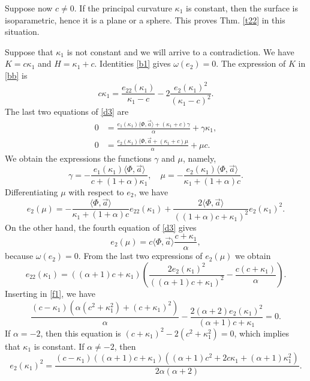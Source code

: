 \documentclass{birkjour}
\theoremstyle{definition}
\theoremstyle{remark}
\numberwithin{equation}{section}
\begin{document}
 Suppose now $c\not=0$. If the principal curvature   $\kappa_1$ is constant, then the surface is isoparametric, hence it is a plane or a sphere. This proves Thm. \ref{t22} in this situation.
 
 Suppose that $\kappa_1$ is not constant and we will arrive to a contradiction. We have $K=c\kappa_1$ and $H=\kappa_1+c$. Identities \eqref{b1} gives $\omega(e_2)=0$. The expression of $K$ in \eqref{bb} is
 \begin{equation}\label{f1}
 c\kappa_1=\frac{e_{22}(\kappa_1)}{\kappa_1-c}-2\frac{e_2(\kappa_1)^2}{(\kappa_1-c)^2}. 
 \end{equation}
The last two equations of \eqref{d3} are
 \begin{equation*}
 \begin{split}
 0&=\frac{e_1(\kappa_1)\langle\Phi,\vec{a}\rangle+(\kappa_1+c)\gamma}{\alpha}+\gamma \kappa_1,\\
 0&=\frac{e_2(\kappa_1)\langle\Phi,\vec{a}+(\kappa_1+c)\mu}{\alpha}+\mu c.
 \end{split}
 \end{equation*}
 We obtain the expressions the functions $\gamma$ and $\mu$, namely,  
 $$\gamma=-\frac{e_1(\kappa_1)\langle\Phi,\vec{a}\rangle}{c+(1+\alpha)\kappa_1},\quad \mu=-\frac{e_2(\kappa_1)\langle\Phi,\vec{a}\rangle}{\kappa_1+(1+\alpha)c}.$$
  Differentiating $\mu$ with respect to $e_2$, we have
\begin{equation*}
e_2(\mu)=-\frac{\langle\Phi,\vec{a}\rangle}{\kappa_1+(1+\alpha)c}e_{22}(\kappa_1)+  \frac{2\langle\Phi,\vec{a}\rangle}{((1+\alpha)c+\kappa_1)^2}e_2(\kappa_1)^2.
\end{equation*}
On the other hand, the fourth equation of \eqref{d3} gives
$$e_2(\mu)=c\langle\Phi,\vec{a}\rangle \frac{c+\kappa_1}{\alpha},$$
because $\omega(e_2)=0$. From the last two expressions of $e_2(\mu)$ we obtain 
\begin{equation}\label{E1}
e_{22}(\kappa_1)=((\alpha+1)c+\kappa_1) \left(\frac{2 e_2(\kappa_1)^2}{((\alpha+1)c+\kappa_1)^2}-\frac{c (c+\kappa_1)}{\alpha }\right).
\end{equation}
 Inserting in \eqref{f1}, we have 
 $$\frac{(c-\kappa_1) \left(\alpha  \left(c^2+\kappa_1^2\right)+(c+\kappa_1)^2\right)}{\alpha }-\frac{2 (\alpha +2) e_2(\kappa_1)^2}{(\alpha+1)c+\kappa_1}=0.$$
 If $\alpha=-2$, then this equation is $(c+\kappa_1)^2-2 \left(c^2+\kappa_1^2\right)=0$, which implies that $\kappa_1$ is constant. If $\alpha\not=-2$, then 
\begin{equation}\label{E2}
e_2(\kappa_1)^2=\frac{(c-\kappa_1) ((\alpha+1)c+\kappa_1) \left((\alpha +1) c^2+2 c \kappa_1+(\alpha +1)\kappa_1^2\right)}{2 \alpha  (\alpha +2)}.
\end{equation}
\end{document}
